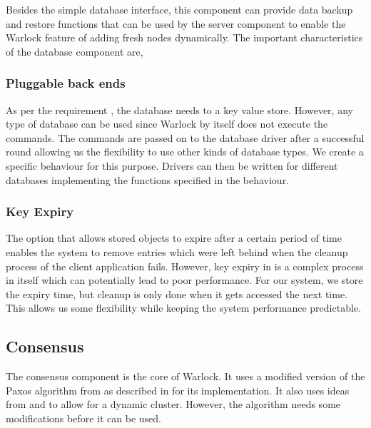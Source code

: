 Besides the simple database interface, this component can provide data
backup and restore functions that can be used by the server component to
enable the Warlock feature of adding fresh nodes dynamically. The important
characteristics of the database component are,

\subsubsection{Pluggable back ends}

As per the requirement , the database needs to a
key value store. However, any type of database can be used
since Warlock by itself does not execute the commands. The commands are passed
on to the database driver after a successful round allowing us the flexibility
to use other kinds of database types. We create a specific behaviour%
for this purpose. Drivers can then be written for different databases
implementing the functions specified in the behaviour.

\subsubsection{Key Expiry}
\label{section:a.n.d.expiry}

The option that allows stored objects to expire after a certain period of time
enables the system to remove entries which were left behind when the
cleanup process of the client application fails. However, key expiry in is a
complex process in itself which can potentially lead to
poor performance. For our system, we store the expiry time, but cleanup is
only done when it gets accessed the next time. This allows us some
flexibility while keeping the system performance predictable.

\subsection{Consensus}

The consensus component is the core of Warlock. It uses a modified version of
the Paxos algorithm from \citet{Robbert2011} as described in
 for its implementation. It also
uses ideas from \citet{LamportSP08} and \citet{LamportMZ10} to allow for
a dynamic cluster. However, the algorithm needs some modifications
 before it can be used.


